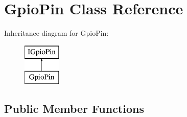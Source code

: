 \hypertarget{class_gpio_pin}{}\section{Gpio\+Pin Class Reference}
\label{class_gpio_pin}
Inheritance diagram for Gpio\+Pin\+:\begin{figure}[H]
\begin{center}
\leavevmode
\includegraphics[height=2.000000cm]{class_gpio_pin}
\end{center}
\end{figure}
\subsection*{Public Member Functions}
